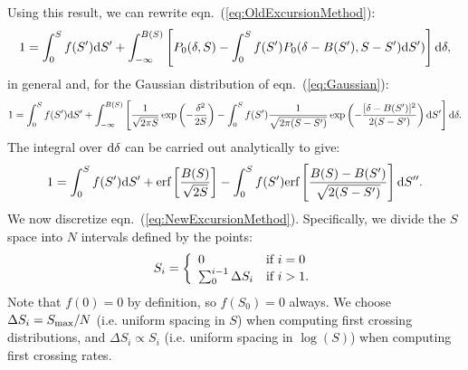 Using this result, we can rewrite eqn.~(\ref{eq:OldExcursionMethod}):
\begin{equation}
  1 = \int_0^S f(S^\prime){\rm d}S^\prime + \int_{-\infty}^{B(S)} \left[ P_0(\delta,S) -  \int_{0}^{S} f(S^\prime) P_0(\delta - B(S^\prime),S - S^\prime){\rm d}S^\prime )\right] {\rm d} \delta ,
\end{equation}
in general and, for the Gaussian distribution of eqn.~(\ref{eq:Gaussian}):
\begin{equation}
  1 =  \int_0^S f(S^\prime){\rm d}S^\prime + \int_{-\infty}^{B(S)} \left[ \frac{1}{\sqrt{2 \pi S}} \exp\left(-\frac{\delta^2}{2 S}\right) -  \int_{0}^{S} f(S^\prime) \frac{1}{\sqrt{2 \pi (S-S^\prime)}} \exp\left(-\frac{[\delta - B(S^\prime)]^2}{2 (S-S^\prime)}\right){\rm d}S^\prime \right] {\rm d} \delta .
\end{equation}
The integral over ${\rm d}\delta$ can be carried out analytically to give:
\begin{equation}
 1 =  \int_0^S f(S^\prime){\rm d}S^\prime+  \hbox{erf}\left[\frac{B(S)}{\sqrt{2S}}\right]  -  \int_{0}^{S}  f(S^\prime)  \hbox{erf}\left[\frac{B(S) - B(S^\prime)}{\sqrt{2 (S-S^\prime)}}\right] {\rm d}S^{\prime\prime}.
\label{eq:NewExcursionMethod}
\end{equation}
We now discretize eqn.~(\ref{eq:NewExcursionMethod}). Specifically, we divide the $S$ space into $N$ intervals defined by the points:
\begin{equation}
  S_i = \left\{ \begin{array}{ll}
                 0 & \hbox{if } i=0 \\
                 \sum_0^{i-1} \Delta S_i & \hbox{if } i > 1.
                \end{array}
        \right.
\end{equation}
Note that $f(0)=0$ by definition, so $f(S_0)=0$ always. We choose $\Delta S_i = S_{\rm max}/N$ (i.e. uniform spacing in $S$) when computing first crossing distributions, and $\Delta S_i \propto S_i$ (i.e. uniform spacing in $\log(S)$) when computing first crossing rates.

